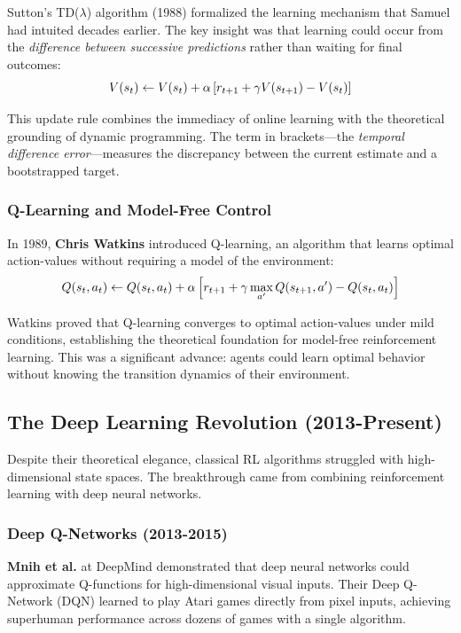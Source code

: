 Sutton's TD($\lambda$) algorithm (1988) formalized the learning mechanism that Samuel had intuited decades earlier. The key insight was that learning could occur from the \textit{difference between successive predictions} rather than waiting for final outcomes:
\begin{equation}
V(s_t) \leftarrow V(s_t) + \alpha \left[ r_{t+1} + \gamma V(s_{t+1}) - V(s_t) \right]
\label{eq:td_learning}
\end{equation}

This update rule combines the immediacy of online learning with the theoretical grounding of dynamic programming. The term in brackets---the \textit{temporal difference error}---measures the discrepancy between the current estimate and a bootstrapped target.

\subsubsection{Q-Learning and Model-Free Control}

In 1989, \textbf{Chris Watkins} introduced Q-learning, an algorithm that learns optimal action-values without requiring a model of the environment:
\begin{equation}
Q(s_t, a_t) \leftarrow Q(s_t, a_t) + \alpha \left[ r_{t+1} + \gamma \max_{a'} Q(s_{t+1}, a') - Q(s_t, a_t) \right]
\label{eq:qlearning_preview}
\end{equation}

Watkins proved that Q-learning converges to optimal action-values under mild conditions, establishing the theoretical foundation for model-free reinforcement learning. This was a significant advance: agents could learn optimal behavior without knowing the transition dynamics of their environment.

\subsection{The Deep Learning Revolution (2013-Present)}

Despite their theoretical elegance, classical RL algorithms struggled with high-dimensional state spaces. The breakthrough came from combining reinforcement learning with deep neural networks.

\subsubsection{Deep Q-Networks (2013-2015)}

\textbf{Mnih et al.} at DeepMind demonstrated that deep neural networks could approximate Q-functions for high-dimensional visual inputs. Their Deep Q-Network (DQN) learned to play Atari games directly from pixel inputs, achieving superhuman performance across dozens of games with a single algorithm.

